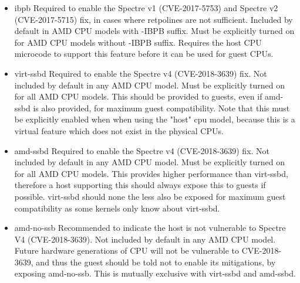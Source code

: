\begin{itemize}[leftmargin=2cm]

	\item ibpb Required to enable the Spectre v1 (CVE-2017-5753) and Spectre v2 (CVE-2017-5715) fix, in cases where retpolines are not sufficient. Included by default in AMD CPU models with -IBPB suffix. Must be explicitly turned on for AMD CPU models without -IBPB suffix. Requires the host CPU microcode to support this feature before it can be used for guest CPUs.

	\item virt-ssbd Required to enable the Spectre v4 (CVE-2018-3639) fix. Not included by default in any AMD CPU model. Must be explicitly turned on for all AMD CPU models. This should be provided to guests, even if amd-ssbd is also provided, for maximum guest compatibility. Note that this must be explicitly enabled when when using the "host" cpu model, because this is a virtual feature which does not exist in the physical CPUs.

	\item amd-ssbd Required to enable the Spectre v4 (CVE-2018-3639) fix. Not included by default in any AMD CPU model. Must be explicitly turned on for all AMD CPU models. This provides higher performance than virt-ssbd, therefore a host supporting this should always expose this to guests if possible. virt-ssbd should none the less also be exposed for maximum guest compatibility as some kernels only know about virt-ssbd.

	\item amd-no-ssb Recommended to indicate the host is not vulnerable to Spectre V4 (CVE-2018-3639). Not included by default in any AMD CPU model. Future hardware generations of CPU will not be vulnerable to CVE-2018-3639, and thus the guest should be told not to enable its mitigations, by exposing amd-no-ssb. This is mutually exclusive with virt-ssbd and amd-ssbd.

\end{itemize}

